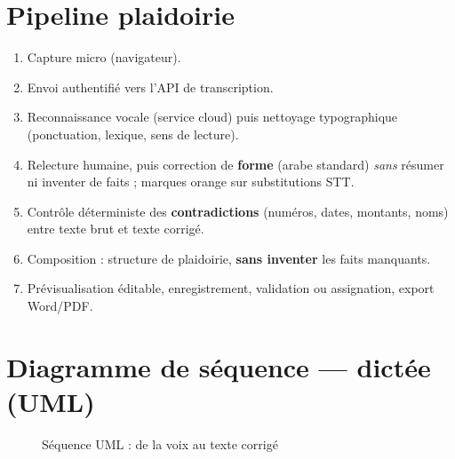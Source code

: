 \section{Pipeline plaidoirie}

\begin{enumerate}[label=\textbf{P\arabic*.}]
  \item Capture micro (navigateur).
  \item Envoi authentifié vers l'API de transcription.
  \item Reconnaissance vocale (service cloud) puis nettoyage typographique (ponctuation, lexique, sens de lecture).
  \item Relecture humaine, puis correction de \textbf{forme} (arabe standard) \emph{sans} résumer ni inventer de faits ; marques orange sur substitutions STT.
  \item Contrôle déterministe des \textbf{contradictions} (numéros, dates, montants, noms) entre texte brut et texte corrigé.
  \item Composition : structure de plaidoirie, \textbf{sans inventer} les faits manquants.
  \item Prévisualisation éditable, enregistrement, validation ou assignation, export Word/PDF.
\end{enumerate}

\section{Diagramme de séquence --- dictée (UML)}

\begin{figure}[H]
\centering
{}
\caption{Séquence UML : de la voix au texte corrigé}
\label{fig:seq-stt}
\end{figure}

